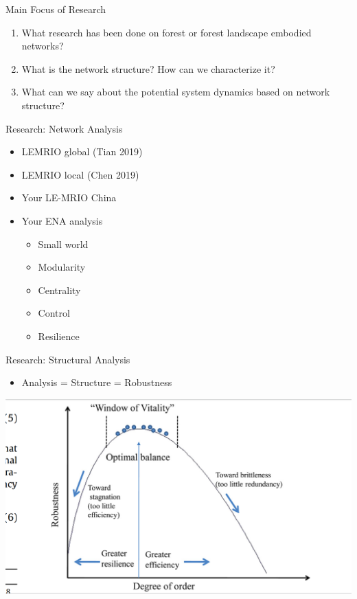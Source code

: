 \documentclass[ignorenonframetext,]{beamer}
\providecommand{\tightlist}{%
  \setlength{\itemsep}{0pt}\setlength{\parskip}{0pt}}
\begin{document}
\begin{frame}{Main Focus of Research}
\protect\hypertarget{main-focus-of-research}{}

\begin{enumerate}
\tightlist
\item
  What research has been done on forest or forest landscape embodied
  networks?
\item
  What is the network structure? How can we characterize it?
\item
  What can we say about the potential system dynamics based on network
  structure?
\end{enumerate}

\end{frame}

\begin{frame}{Research: Network Analysis}
\protect\hypertarget{research-network-analysis}{}

\begin{itemize}
\tightlist
\item
  LEMRIO global (Tian 2019)
\item
  LEMRIO local (Chen 2019)
\item
  Your LE-MRIO China
\item
  Your ENA analysis

  \begin{itemize}
  \tightlist
  \item
    Small world
  \item
    Modularity
  \item
    Centrality
  \item
    Control
  \item
    Resilience
  \end{itemize}
\end{itemize}

\end{frame}

\begin{frame}{Research: Structural Analysis}
\protect\hypertarget{research-structural-analysis}{}

\begin{itemize}
\tightlist
\item
  Analysis = Structure = Robustness
\end{itemize}

\begin{center}\includegraphics[width=0.5\linewidth]{images/Fath_2015_Fig6} \end{center}

\end{frame}
\end{document}

